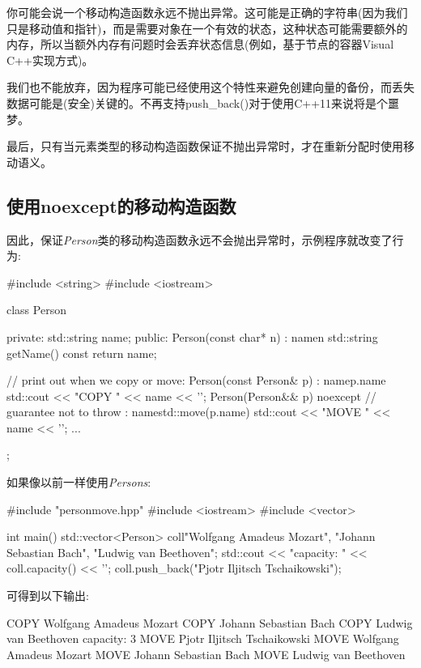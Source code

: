 你可能会说一个移动构造函数永远不抛出异常。这可能是正确的字符串(因为我们只是移动值和指针)，而是需要对象在一个有效的状态，这种状态可能需要额外的内存，所以当额外内存有问题时会丢弃状态信息(例如，基于节点的容器Visual C++实现方式)。

我们也不能放弃，因为程序可能已经使用这个特性来避免创建向量的备份，而丢失数据可能是(安全)关键的。不再支持push_back()对于使用C++11来说将是个噩梦。

最后，只有当元素类型的移动构造函数保证不抛出异常时，才在重新分配时使用移动语义。

\subsection{使用noexcept的移动构造函数}

因此，保证\textit{Person}类的移动构造函数永远不会抛出异常时，示例程序就改变了行为:

\begin{cppcode}
#include <string>
#include <iostream>

class Person {
	private:
	std::string name;
	public:
	Person(const char* n)
	: name{n} {
	}
	std::string getName() const {
		return name;
	}

	// print out when we copy or move:
	Person(const Person& p)
	: name{p.name} {
		std::cout << "COPY " << name << '\n';
	}
	Person(Person&& p) noexcept // guarantee not to throw
	: name{std::move(p.name)} {
		std::cout << "MOVE " << name << '\n';
	}
	...
};
\end{cppcode}

如果像以前一样使用\textit{Persons}:

\begin{cppcode}
#include "personmove.hpp"
#include <iostream>
#include <vector>

int main()
{
	std::vector<Person> coll{"Wolfgang Amadeus Mozart",
		"Johann Sebastian Bach",
		"Ludwig van Beethoven"};
	std::cout << "capacity: " << coll.capacity() << '\n';
	coll.push_back("Pjotr Iljitsch Tschaikowski");
}
\end{cppcode}

可得到以下输出:

\begin{outputcode}
COPY Wolfgang Amadeus Mozart
COPY Johann Sebastian Bach
COPY Ludwig van Beethoven
capacity: 3
MOVE Pjotr Iljitsch Tschaikowski
MOVE Wolfgang Amadeus Mozart
MOVE Johann Sebastian Bach
MOVE Ludwig van Beethoven
\end{outputcode}

